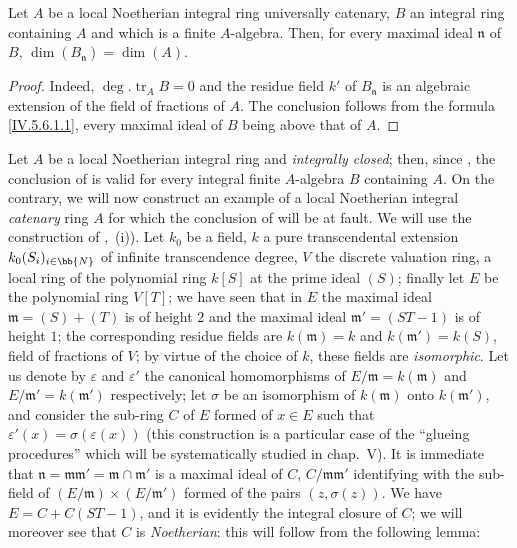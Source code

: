 \begin{proposition}[5.6.10]
\label{IV.5.6.10}
Let $A$ be a local Noetherian integral ring universally catenary, $B$ an integral ring containing $A$ and which is a finite $A$-algebra.
Then, for every maximal ideal $\mathfrak{n}$ of $B$, $\dim(B_\mathfrak{n})=\dim(A)$.
\end{proposition}

\begin{proof}
Indeed, $\deg.\operatorname{tr}_A B=0$ and the residue field $k'$ of $B_\mathfrak{n}$ is an algebraic extension of the field of fractions of $A$.
The conclusion follows from the formula \eqref{IV.5.6.1.1}, every maximal ideal of $B$ being above that of $A$.
\end{proof}

\begin{example}[5.6.11]
\label{IV.5.6.11}
Let $A$ be a local Noetherian integral ring and \emph{integrally closed}; then, since , the conclusion of  is valid for every integral finite $A$-algebra $B$ containing $A$.
On the contrary, we will now construct an example of a local Noetherian integral \emph{catenary} ring $A$ for which the conclusion of  will be at fault.
We will use the construction of ,~(i)).
Let $k_0$ be a field, $k$ a pure transcendental extension $k_0(S_i)_{i\in\bb{N}}$ of infinite transcendence degree, $V$ the discrete valuation ring, a local ring of the polynomial ring $k[S]$ at the prime ideal $(S)$; finally let $E$ be the polynomial ring $V[T]$; we have seen that in $E$ the maximal ideal $\mathfrak{m}=(S)+(T)$ is of height $2$ and the maximal ideal $\mathfrak{m}'=(ST-1)$ is of height $1$;
the corresponding residue fields are $k(\mathfrak{m})=k$ and $k(\mathfrak{m}')=k(S)$, field of fractions of $V$; by virtue of the choice of $k$, these fields are \emph{isomorphic}.
Let us denote by $\varepsilon$ and $\varepsilon'$ the canonical homomorphisms of $E/\mathfrak{m}=k(\mathfrak{m})$ and $E/\mathfrak{m}'=k(\mathfrak{m}')$ respectively; let $\sigma$ be an isomorphism of $k(\mathfrak{m})$ onto $k(\mathfrak{m}')$, and consider the sub-ring $C$ of $E$ formed of $x\in E$ such that $\varepsilon'(x)=\sigma(\varepsilon(x))$ (this construction is a particular case of the ``glueing procedures'' which will be systematically studied in chap.~V).
It is immediate that $\mathfrak{n}=\mathfrak{m}\mathfrak{m}'=\mathfrak{m}\cap\mathfrak{m}'$ is a maximal ideal of $C$, $C/\mathfrak{m}\mathfrak{m}'$ identifying with the sub-field of $(E/\mathfrak{m})\times(E/\mathfrak{m}')$ formed of the pairs $(z,\sigma(z))$.
We have $E=C+C(ST-1)$, and it is evidently the integral closure of $C$; we will moreover see that $C$ is \emph{Noetherian}: this will follow from the following lemma:


\end{example}
